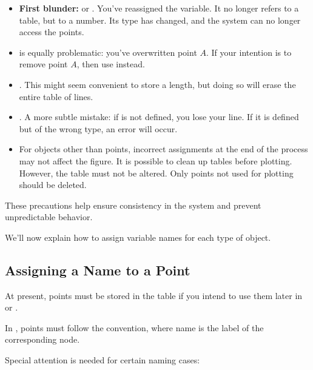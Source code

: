 \begin{itemize}
  \item \textbf{First blunder:}  or . You've reassigned the  variable. It no longer refers to a table, but to a number. Its type has changed, and the system can no longer access the points.
  \item {} is equally problematic: you’ve overwritten point $A$. If your intention is to remove point $A$, then use  instead.
  \item {}. This might seem convenient to store a length, but doing so will erase the entire table of lines.
  \item {}. A more subtle mistake: if  is not defined, you lose your line. If it is defined but of the wrong type, an error will occur.
  \item For objects other than points, incorrect assignments at the end of the process may not affect the figure. It is possible to clean up tables before plotting. However, the  table must not be altered. Only points not used for plotting should be deleted.
\end{itemize}

These precautions help ensure consistency in the system and prevent unpredictable behavior.

\vspace{1em}
We’ll now explain how to assign variable names for each type of object.

\subsection{Assigning a Name to a Point} %
\label{sub:assigning_a_name_to_a_point}

At present, points must be stored in the table  if you intend to use them later in \tkzNamePack{\TIKZ} or .

In , points must follow the  convention, where name is the label of the corresponding node.

Special attention is needed for certain naming cases:


